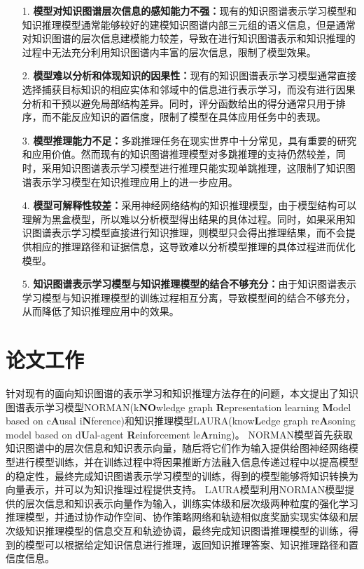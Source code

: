 \documentclass[algorithmlist, AutoFakeBold, AutoFakeSlant, figurelist, tablelist, nomlist, masters]{seuthesix}
\begin{document}
\begin{itemize}
  \item [1.]\textbf{模型对知识图谱层次信息的感知能力不强：}现有的知识图谱表示学习模型和知识推理模型通常能够较好的建模知识图谱内部三元组的语义信息，但是通常对知识图谱的层次信息建模能力较差，导致在进行知识图谱表示和知识推理的过程中无法充分利用知识图谱内丰富的层次信息，限制了模型效果。
  \item [2.]\textbf{模型难以分析和体现知识的因果性：}现有的知识图谱表示学习模型通常直接选择捕获目标知识的相应实体和邻域中的信息进行表示学习，而没有进行因果分析和干预以避免局部结构差异。同时，评分函数给出的得分通常只用于排序，而不能反应知识的置信度，限制了模型在具体应用任务中的表现。
  \item [3.]\textbf{模型推理能力不足：}多跳推理任务在现实世界中十分常见，具有重要的研究和应用价值。然而现有的知识图谱推理模型对多跳推理的支持仍然较差，同时，采用知识图谱表示学习模型进行推理只能实现单跳推理，这限制了知识图谱表示学习模型在知识推理应用上的进一步应用。
  \item [4.]\textbf{模型可解释性较差：}采用神经网络结构的知识推理模型，由于模型结构可以理解为黑盒模型，所以难以分析模型得出结果的具体过程。同时，如果采用知识图谱表示学习模型直接进行知识推理，则模型只会得出推理结果，而不会提供相应的推理路径和证据信息，这导致难以分析模型推理的具体过程进而优化模型。
  \item [5.]\textbf{知识图谱表示学习模型与知识推理模型的结合不够充分：}由于知识图谱表示学习模型与知识推理模型的训练过程相互分离，导致模型间的结合不够充分，从而降低了知识推理应用中的效果。
\end{itemize}

\section{论文工作}
针对现有的面向知识图谱的表示学习和知识推理方法存在的问题，本文提出了知识图谱表示学习模型NORMAN(k\textbf{NO}wledge graph \textbf{R}epresentation learning \textbf{M}odel based on c\textbf{A}usal i\textbf{N}ference)和知识推理模型LAURA(know\textbf{L}edge graph re\textbf{A}soning model based on d\textbf{U}al-agent \textbf{R}einforcement le\textbf{A}rning)。
NORMAN模型首先获取知识图谱中的层次信息和知识表示向量，随后将它们作为输入提供给图神经网络模型进行模型训练，并在训练过程中将因果推断方法融入信息传递过程中以提高模型的稳定性，最终完成知识图谱表示学习模型的训练，得到的模型能够将知识转换为向量表示，并可以为知识推理过程提供支持。
LAURA模型利用NORMAN模型提供的层次信息和知识表示向量作为输入，训练实体级和层次级两种粒度的强化学习推理模型，并通过协作动作空间、协作策略网络和轨迹相似度奖励实现实体级和层次级知识推理模型的信息交互和轨迹协调，最终完成知识图谱推理模型的训练，得到的模型可以根据给定知识信息进行推理，返回知识推理答案、知识推理路径和置信度信息。
\end{document}
